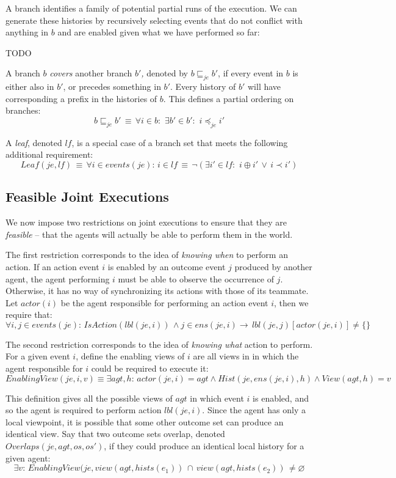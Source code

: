 A branch identifies a family of potential partial runs of the execution.
We can generate these histories by recursively selecting events that
do not conflict with anything in $b$ and are enabled given what we
have performed so far:

TODO

A branch $b$ \emph{covers} another branch \emph{$b'$,} denoted by
$b\sqsubseteq_{je}b'$, if every event in $b$ is either also in $b'$,
or precedes something in $b'$. Every history of $b'$ will have corresponding
a prefix in the histories of $b$. This defines a partial ordering
on branches:\[
b\sqsubseteq_{je}b'\,\equiv\,\forall i\in b:\,\,\exists b'\in b':\,\, i\preceq_{je}i'\]


A \emph{leaf}, denoted $lf$, is a special case of a branch set that
meets the following additional requirement:\[
Leaf(je,lf)\,\equiv\,\forall i\in events(je):\, i\in lf\,\equiv\,\neg(\exists i'\in lf:\,\, i\oplus i'\,\vee\, i\prec i')\]



\subsection{Feasible Joint Executions}

We now impose two restrictions on joint executions to ensure that
they are \emph{feasible} -- that the agents will actually be able
to perform them in the world.

The first restriction corresponds to the idea of \emph{knowing when}
to perform an action. If an action event $i$ is enabled by an outcome
event $j$ produced by another agent, the agent performing $i$ must
be able to observe the occurrence of $j$. Otherwise, it has no way
of synchronizing its actions with those of its teammate. Let $actor(i)$
be the agent responsible for performing an action event $i$, then
we require that:\[
\forall i,j\in events(je):\, IsAction(lbl(je,i))\,\wedge j\in ens(je,i)\rightarrow\, lbl(je,j)[actor(je,i)]\neq\{\}\]


The second restriction corresponds to the idea of \emph{knowing what}
action to perform. For a given event $i$, define the enabling views
of $i$ are all views in in which the agent responsible for $i$ could
be required to execute it:\[
EnablingView(je,i,v)\equiv\exists agt,h:\, actor(je,i)=agt\wedge Hist(je,ens(je,i),h)\wedge View(agt,h)=v\]


This definition gives all the possible views of $agt$ in which event
$i$ is enabled, and so the agent is required to perform action $lbl(je,i)$.
Since the agent has only a local viewpoint, it is possible that some
other outcome set can produce an identical view. Say that two outcome
sets overlap, denoted $Overlaps(je,agt,os,os')$, if they could produce
an identical local history for a given agent:\[
\exists v:\, EnablingView(je,view(agt,hists(e_{1}))\,\cap\, view(agt,hists(e_{2}))\,\neq\varnothing\]


